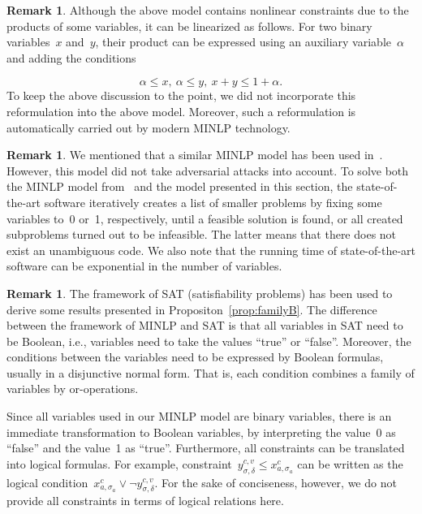 \documentclass[11pt,a4paper]{article}
\theoremstyle{definition}
\newtheorem{remark}[theorem]{Remark}
\begin{document}
\newpage

\begin{remark}
  Although the above model contains nonlinear constraints due to the
  products of some variables, it can be linearized as follows.
  For two binary variables~$x$ and~$y$, their product can be expressed
  using an auxiliary variable~$\alpha$ and adding the conditions
  
  $$\alpha
  \leq x,\ \alpha \leq y,\ x + y \leq 1 + \alpha.$$
  To keep the above discussion to the point, we did not incorporate
  this reformulation into the above model.
  Moreover, such a reformulation is automatically carried out by modern
  MINLP technology.
\end{remark}

\begin{remark}
    We mentioned that a similar MINLP model has been used in~\cite{hojny2023role}.
    However, this model did not take adversarial attacks into account.
    To solve both the MINLP model from~\cite{hojny2023role} and the model presented in this section, the state-of-the-art software iteratively creates a list of smaller problems by fixing some variables to~0 or~1, respectively, until a feasible solution is found, or all created subproblems turned out to be infeasible.
    The latter means that there does not exist an unambiguous code.
    We also note that the running time of state-of-the-art software can be exponential in the number of variables.
\end{remark}

\begin{remark}
    The framework of SAT (satisfiability problems) has been used to derive some results presented in Propositon~\ref{prop:familyB}.
    The difference between the framework of MINLP and SAT is that all variables in SAT need to be Boolean, i.e., variables need to take the values ``true'' or ``false''.
    Moreover, the conditions between the variables need to be expressed by Boolean formulas, usually in a disjunctive normal form.
    That is, each condition combines a family of variables by or-operations.

    Since all variables used in our MINLP model are binary variables, there is an immediate transformation to Boolean variables, by interpreting the value~0 as ``false'' and the value~1 as ``true''.
    Furthermore, all constraints can be translated into logical formulas.
    For example, constraint~$y^{c,v}_{\sigma,\delta} \leq x^c_{a,\sigma_a}$ can be written as the logical condition~$x^c_{a,\sigma_a} \vee \neg y^{c,v}_{\sigma,\delta}$.
    For the sake of conciseness, however, we do not provide all constraints in terms of logical relations here.
\end{remark}
\end{document}
